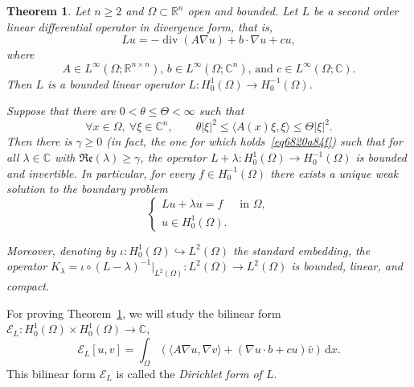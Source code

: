 \documentclass[a4paper,9pt]{amsart}
\newcommand{\scr}[1]{\mathscr{#1}}
\newcommand{\frk}[1]{\mathfrak{#1}}
\newcommand{\R}{\mathbb{R}}	%
\newcommand{\C}{\mathbb{C}}	%
\newcommand{\did}{\,\mathrm{d}}	%
\renewcommand{\div}{\operatorname{div}}	%
\newcommand{\into}{\hookrightarrow}		%
\newcommand{\real}{\frk{Re}}
\newcommand{\grad}{\nabla}
\theoremstyle{plain}
\newtheorem{theorem}[proposition]{Theorem}
\theoremstyle{definition}
\theoremstyle{remark}
\begin{document}
\begin{theorem}\label{thm682098e8}
	Let $n\ge2$ and $\Omega\subset\R^n$ open and bounded.
	Let $L$ be a second order linear differential operator in divergence form, that is,
	\begin{equation}\label{eq6820a731}
		Lu = -\div(A\grad u) + b\cdot \grad u + c u ,
	\end{equation}
	where 
	\begin{equation}\label{eq6820a660}
		\text{$A\in L^\infty(\Omega;\R^{n\times n})$,
	$b\in L^\infty(\Omega;\C^n)$,
	and $c\in L^\infty(\Omega;\C)$.}
	\end{equation}
	Then $L$ is a bounded linear operator $L:H^1_0(\Omega)\to H^{-1}_0(\Omega)$.
	
	Suppose that there are $0<\theta\le \Theta<\infty$ such that
	\begin{equation}\label{eq6820970d}
		\forall x\in\Omega,\ \forall\xi\in\C^n,\qquad
		\theta |\xi|^2
		\le \langle A(x)\xi,\xi \rangle 
		\le \Theta |\xi|^2 .
	\end{equation}
	Then there is $\gamma\ge 0$ (in fact, the one for which holds~\eqref{eq6820a84f}) 
	such that for all $\lambda\in\C$ with $\real(\lambda)\ge\gamma$,
	the operator $L+\lambda :H^1_0(\Omega)\to H^{-1}_0(\Omega)$ is bounded and invertible.
	In particular, for every $f\in H^{-1}_0(\Omega)$ there exists a unique weak solution to the boundary problem
	\begin{equation}\label{eq6821b354}
		\begin{cases}
		Lu + \lambda u = f &\text{ in }\Omega, \\
		u\in H^1_0(\Omega) .
		\end{cases}
	\end{equation}
	
	Moreover,
	denoting by $\iota:H^1_0(\Omega)\into L^2(\Omega)$ the standard embedding,
	the operator $K_\lambda = \iota \circ (L-\lambda)^{-1}|_{L^2(\Omega)} : L^2(\Omega) \to L^2(\Omega)$
	is bounded, linear, and compact.
%	
\end{theorem}

For proving Theorem~\ref{thm682098e8}, we will study the bilinear form $\scr E_L:H^1_0(\Omega)\times H^1_0(\Omega)\to\C$, 
\begin{equation}\label{eq6820a77c}
	\scr E_L[u,v] = \int_\Omega \left( \langle A\grad u,\grad v \rangle + ( \grad u\cdot b + c u) \bar v \right) \did x .
\end{equation}
This bilinear form $\scr E_L$ is called the \emph{Dirichlet form of $L$}.
\end{document}
